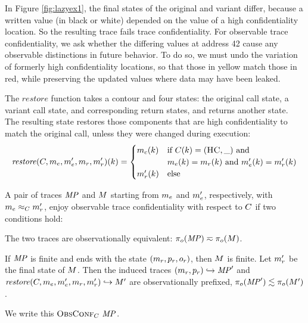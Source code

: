 \documentclass[acmsmall,review,anonymous]{acmart}\settopmatter{printfolios=true,printccs=false,printacmref=false}
\begin{document}
      In Figure \ref{fig:lazyex1}, the final states of the original and variant
      differ, because a written value (in black or white) depended on the value
      of a high confidentiality location. So the resulting trace fails trace
      confidentiality. For observable trace confidentiality, we ask whether the
      differing values at address 42 cause any observable distinctions in
      future behavior. To do so, we must undo the variation of formerly high
      confidentiality locations, so that those in yellow match those in red,
      while preserving the updated values where data may have been leaked.
      
      The \(\mathit{restore}\) function takes a contour and four states: the
      original call state, a variant call state, and corresponding return
      states, and returns another state. The resulting state restores those
      components that are high confidentiality to match the original call,
      unless they were changed during execution:
      \[\mathit{restore}(C,m_e,m_e',m_r,m_r')(k) =
        \begin{cases}
          m_c(k) & \text{if } C(k) = (\textsc{HC},\_) \text{ and } \\
                  & m_e(k) = m_r(k) \text{ and }
                    m_e'(k) = m_r'(k) \\
          m_r'(k) & \text{else} \\
        \end{cases}\]

      A pair of traces \(\mathit{MP}\) and \(M\) starting from \(m_e\) and
      \(m_e'\), respectively, with \(m_e \approx_C m_r'\),
      enjoy observable trace confidentiality with respect to \(C\) if
      two conditions hold:

      The two traces are observationally equivalent: \(\pi_o(\mathit{MP}) \eqsim
      \pi_o(M)\).

      If \(\mathit{MP}\) is finite and ends with the state
      \((m_r,p_r,o_r)\), then \(M\) is finite. Let
      \(m_r'\) be the final state of \(M\). Then the induced traces
      \((m_r,p_r) \hookrightarrow \mathit{MP}'\) and
      \(\mathit{restore}(C,m_e,m_e',m_r,m_r')
      \hookrightarrow M'\) are observationally prefixed,
      \(\pi_o(\mathit{MP}') \lesssim \pi_o(M')\).

      We write this \(\text{\sc ObsConf}_C ~ \mathit{MP}\).
\end{document}
